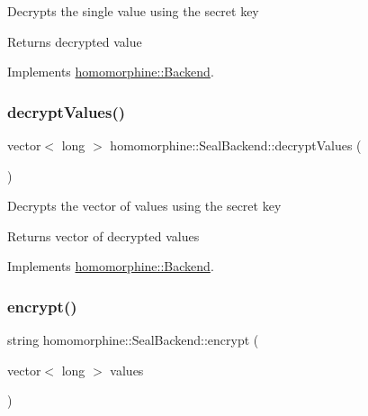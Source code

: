 Decrypts the single value using the secret key

\begin{DoxyReturn}{Returns}
decrypted value 
\end{DoxyReturn}


Implements \mbox{\hyperlink{classhomomorphine_1_1_backend_ae5c5de7bddabef1bd9a935be5bbd9646}{homomorphine\+::\+Backend}}.

\mbox{\label{classhomomorphine_1_1_seal_backend_afa5f6cbb10d74c1911fcb88f722a0159}} 
\subsubsection{\texorpdfstring{decryptValues()}{decryptValues()}}
{\footnotesize\ttfamily vector$<$ long $>$ homomorphine\+::\+Seal\+Backend\+::decrypt\+Values (\begin{DoxyParamCaption}{ }\end{DoxyParamCaption})\hspace{0.3cm}{\ttfamily [virtual]}}

Decrypts the vector of values using the secret key

\begin{DoxyReturn}{Returns}
vector of decrypted values 
\end{DoxyReturn}


Implements \mbox{\hyperlink{classhomomorphine_1_1_backend_a43638a85d3e1a85957f18be262c26f58}{homomorphine\+::\+Backend}}.

\mbox{\label{classhomomorphine_1_1_seal_backend_a0c9f992fb7626e55ad0bbfcc068e8e43}} 
\subsubsection{\texorpdfstring{encrypt()}{encrypt()}\hspace{0.1cm}{\footnotesize\ttfamily [1/2]}}
{\footnotesize\ttfamily string homomorphine\+::\+Seal\+Backend\+::encrypt (\begin{DoxyParamCaption}\item[{vector$<$ long $>$}]{values }\end{DoxyParamCaption})\hspace{0.3cm}{\ttfamily [virtual]}}

